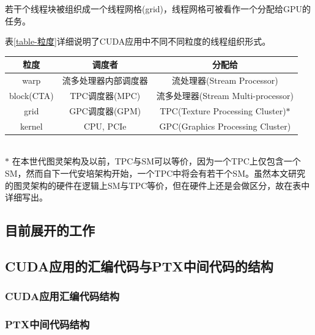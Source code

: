 \par 若干个线程块被组织成一个线程网格(grid)，线程网格可被看作一个分配给GPU的任务。
\par 表\ref{table-粒度}详细说明了CUDA应用中不同不同粒度的线程组织形式。
\begin{center}
	\begin{tabular}{ccc}
		\toprule
		粒度	&	调度者	& 	分配给 \\
		\midrule
		warp		&	流多处理器内部调度器	&	流处理器(Stream Processor)\\
		block(CTA)	&	TPC调度器(MPC)		  &		流多处理器(Stream Multi-processor)\\
		grid		&	GPC调度器(GPM)		  &		TPC(Texture Processing Cluster)$ * $\\
		kernel		&	CPU, PCIe			&		GPC(Graphics Processing Cluster)	\\	
		\bottomrule
	\end{tabular} \label{table-粒度}\\

$ * $ 在本世代图灵架构及以前，TPC与SM可以等价，因为一个TPC上仅包含一个SM，然而自下一代安培架构开始，一个TPC中将会有若干个SM。虽然本文研究的图灵架构的硬件在逻辑上SM与TPC等价，但在硬件上还是会做区分，故在表中详细写出。
\end{center}
\subsection{目前展开的工作}

\subsection{CUDA应用的汇编代码与PTX中间代码的结构}

\subsubsection{CUDA应用汇编代码结构}

\subsubsection{PTX中间代码结构}
